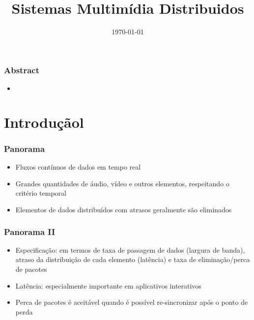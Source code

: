 \documentclass[]{beamer}
\title{Sistemas Multimídia Distribuidos}
\author{}
\institute{}
\date{\today}
\begin{document}
\begin{frame}
  \titlepage
\end{frame}



\begin{frame}
 \frametitle{Abstract}
 \begin{itemize}
   \item 
 \end{itemize}
\end{frame}

\section{Introduçãol}

\begin{frame}
 \frametitle{Panorama}
 \begin{itemize}
   \item Fluxos contínuos de dados em tempo real
   \item Grandes quantidades de áudio, vídeo e outros elementos, respeitando o critério temporal
   \item Elementos de dados distribuídos com atrasos geralmente são eliminados
 \end{itemize}
\end{frame}

\begin{frame}
 \frametitle{Panorama II}
 \begin{itemize}
  \item Especificação: em termos de taxa de passagem de dados (largura de banda),
atraso da distribuição de cada elemento (latência) e taxa de eliminação/perca de pacotes
  \item Latência: especialmente importante em aplicativos interativos
  \item Perca de pacotes é aceitável quando é possível re-sincronizar após o ponto de perda
\end{itemize}
\end{frame}
\end{document}
